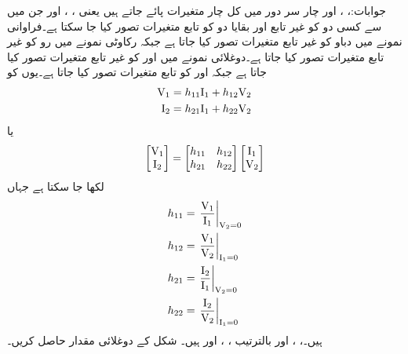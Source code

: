 جوابات:، ،  اور 
چار سر دور میں کل چار متغیرات پائے جاتے ہیں یعنی ، ،  اور  جن میں سے کسی دو کو غیر تابع اور بقایا دو کو تابع متغیرات تصور کیا جا سکتا ہے۔فراوانی نمونے  میں دباو کو غیر تابع متغیرات تصور کیا جاتا ہے جبکہ رکاوٹی  نمونے میں رو کو غیر تابع متغیرات تصور کیا جاتا ہے۔دوغلائی نمونے میں  اور  کو غیر تابع متغیرات تصور کیا جاتا ہے جبکہ  اور  کو تابع متغیرات تصور کیا جاتا ہے۔یوں  کو
\begin{gather}
\begin{aligned}
{\ensuremath{{\textup{V}}}}_1&=h_{11} {{\textup{I}}}_1+h_{12}{{\textup{V}}}_2\\
{{\textup{I}}}_2&=h_{21}{{\textup{I}}}_1+h_{22}{{\textup{V}}}_2
\end{aligned}
\end{gather}
یا
\begin{align}
\begin{bmatrix}
{\ensuremath{{\textup{V}}}}_1\\
{{\textup{I}}}_2
\end{bmatrix}
=
\begin{bmatrix}
h_{11} & h_{12}\\
h_{21} & h_{22}
\end{bmatrix}
\begin{bmatrix}
{\ensuremath{{\textup{I}}}}_1\\
{{\textup{V}}}_2
\end{bmatrix}
\end{align}
لکھا جا سکتا ہے جہاں
\begin{gather}
\begin{aligned}
h_{11}&=\left. \frac{{{\textup{V}}}_1}{{{\textup{I}}}_1}\right|_{{{\textup{V}}}_2=0}\\
h_{12}&=\left. \frac{{{\textup{V}}}_1}{{{\textup{V}}}_2}\right|_{{{\textup{I}}}_1=0}\\
h_{21}&=\left. \frac{{{\textup{I}}}_2}{{{\textup{I}}}_1}\right|_{{{\textup{V}}}_2=0}\\
h_{22}&=\left. \frac{{{\textup{I}}}_2}{{{\textup{V}}}_2}\right|_{{{\textup{I}}}_1=0}
\end{aligned}
\end{gather}
ہیں۔، ،  اور  بالترتیب ، ،  اور  ہیں۔ 
شکل  کے دوغلائی مقدار حاصل کریں۔

